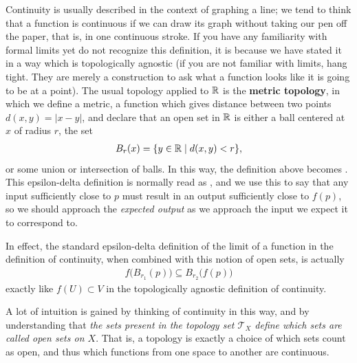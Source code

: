 \documentclass[11pt]{article}
\begin{document}
Continuity is usually described in the context of graphing a line; we tend to think that a function is continuous if we can draw its graph without taking our pen off the paper, that is, in one continuous stroke. If you have any familiarity with formal limits yet do not recognize this definition, it is because we have stated it in a way which is topologically agnostic (if you are not familiar with limits, hang tight. They are merely a construction to ask what a function looks like it is going to be at a point). The usual topology applied to $\mathbb{R}$ is the \textbf{metric topology}, in which we define a metric, a function which gives distance between two points $d(x,y) = |x - y|$, and declare that an open set in $\mathbb{R}$ is either a ball centered at $x$ of radius $r$, the set \begin{gather*}
B_r(x) = \{y \in \mathbb{R} \mid d(x,y) < r \},
\end{gather*}
or some union or intersection of balls. In this way, the definition above becomes . This epsilon-delta definition is normally read as , and we use this to say that any input sufficiently close to $p$ must result in an output sufficiently close to $f(p)$, so we should approach the \emph{expected output} as we approach the input we expect it to correspond to.

In effect, the standard epsilon-delta definition of the limit of a function in the definition of continuity, when combined with this notion of open sets, is actually \begin{gather*}
f\big( B_{r_1}(p) \big) \subseteq B_{r_2} \big( f(p) \big)
\end{gather*}
exactly like $f(U) \subset V$ in the topologically agnostic definition of continuity.

A lot of intuition is gained by thinking of continuity in this way, and by understanding that \emph{the sets present in the topology set $\mathcal{T}_X$ define which sets are called open sets on $X$}. That is, a topology is exactly a choice of which sets count as open, and thus which functions from one space to another are continuous.
\end{document}
